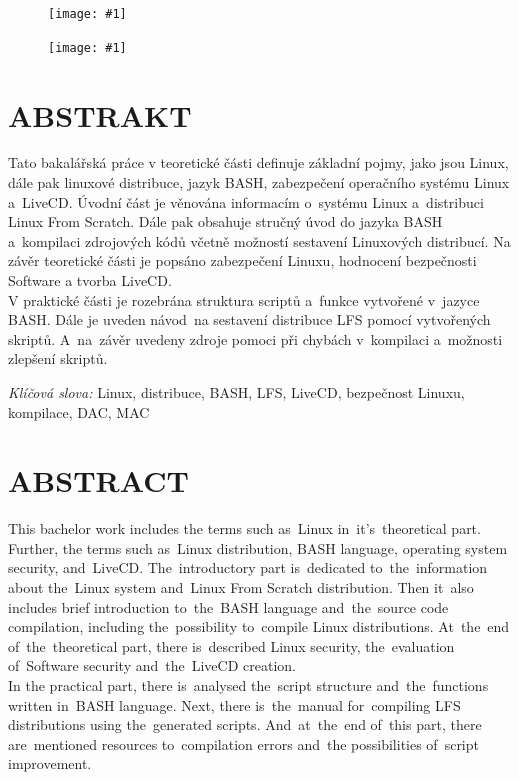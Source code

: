 \documentclass[a4paper,12pt]{article}
\newcommand{\nm}[1]{\clearpage\section*{\uppercase{#1}}}	%
\newcommand{\nns}[1]{\section*{\uppercase{#1}}}		%
\newcommand{\obr}[3]{%
	\begin{figure}[h]
	\center\texttt{[image: \#1]}
	\caption{#3}
	\end{figure}
	}
\newcommand{\ofZadani}[2]{%
	\begin{figure}[h]
	\center\texttt{[image: \#1]}
	\end{figure}
	}
\begin{document}
\clearpage
\thispagestyle{empty}
\ofZadani{./img/ofZadani/ofZadaniStr1.png}{Oficiální zadání bakalářské práce strana 1}
\clearpage
\thispagestyle{empty}
\ofZadani{./img/ofZadani/ofZadaniStr2.png}{Oficiální zadání bakalářské práce strana 2}
\clearpage
\thispagestyle{empty}
\voffset=-1.61cm\evensidemargin=0.96cm\oddsidemargin=0.96cm\headsep=1cm\headheight=0.5cm\setlength{\parskip}{3pt}\textheight=248mm\textwidth=155mm
\nm{\uppercase{Abstrakt}}
\vspace{1cm}
Tato bakalářská práce v teoretické části definuje základní pojmy, jako jsou Linux, dále pak linuxové distribuce, jazyk BASH, zabezpečení operačního systému Linux a~LiveCD. Úvodní část je věnována informacím o~systému Linux a~distribuci Linux From Scratch. Dále pak obsahuje stručný úvod do jazyka BASH a~kompilaci zdrojových kódů včetně možností sestavení Linuxových distribucí. Na závěr teoretické části je popsáno zabezpečení Linuxu, hodnocení bezpečnosti Software a tvorba LiveCD.\\

V praktické části je rozebrána struktura scriptů a~funkce vytvořené v~jazyce BASH. Dále je uveden návod~na sestavení distribuce LFS pomocí vytvořených skriptů. A~na~závěr uvedeny zdroje pomoci při chybách v~kompilaci a~možnosti zlepšení skriptů.
\vspace{1cm}

\emph{Klíčová slova:} Linux, distribuce, BASH, LFS, LiveCD, bezpečnost Linuxu, kompilace, DAC, MAC
\vspace{2cm}

\nns{\uppercase{Abstract}}
This bachelor work includes the terms such as~Linux in~it's~theoretical part. Further, the terms such as~Linux distribution, BASH language, operating system security, and~LiveCD. The~introductory part is~dedicated to~the~information about the~Linux system and~Linux From Scratch distribution. Then it~also includes brief introduction to~the~BASH language and~the~source code compilation, including the~possibility to~compile Linux distributions. At~the~end of~the~theoretical part, there is~described Linux security, the~evaluation of~Software security and~the~LiveCD creation.\\

In the practical part, there is~analysed the~script structure and~the~functions written in~BASH language. Next, there is~the~manual for~compiling LFS distributions using the~generated scripts. And~at~the~end of~this part, there are~mentioned resources to~compilation errors and~the possibilities of~script improvement.
\vspace{1cm}
\end{document}
